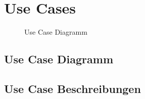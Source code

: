 \chapter{Use Cases}
\label{chap:usecases}

\begin{figure}[htbp]
	\centering
    
    \caption{Use Case Diagramm}
\end{figure}


\section{Use Case Diagramm}



\section{Use Case Beschreibungen}
\label{usecase:description}




































